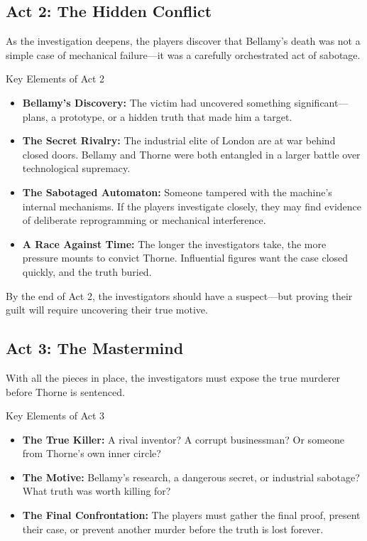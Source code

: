 \subsection{Act 2: The Hidden Conflict}  
As the investigation deepens, the players discover that Bellamy’s death was not a simple case of mechanical failure—it was a carefully orchestrated act of sabotage.

\begin{Example}{Key Elements of Act 2}
    \begin{itemize}
        \item \textbf{Bellamy’s Discovery:} The victim had uncovered something significant—plans, a prototype, or a hidden truth that made him a target.
        \item \textbf{The Secret Rivalry:} The industrial elite of London are at war behind closed doors. Bellamy and Thorne were both entangled in a larger battle over technological supremacy.
        \item \textbf{The Sabotaged Automaton:} Someone tampered with the machine’s internal mechanisms. If the players investigate closely, they may find evidence of deliberate reprogramming or mechanical interference.
        \item \textbf{A Race Against Time:} The longer the investigators take, the more pressure mounts to convict Thorne. Influential figures want the case closed quickly, and the truth buried.
    \end{itemize}
\end{Example}

\noindent
By the end of Act 2, the investigators should have a suspect—but proving their guilt will require uncovering their true motive.

\subsection{Act 3: The Mastermind}

With all the pieces in place, the investigators must expose the true murderer before Thorne is sentenced.

\begin{Example}{Key Elements of Act 3}
    \begin{itemize}\raggedright
        \item \textbf{The True Killer:} A rival inventor? A corrupt businessman? Or someone from Thorne’s own inner circle?
        \item \textbf{The Motive:} Bellamy’s research, a dangerous secret, or industrial sabotage? What truth was worth killing for?
        \item \textbf{The Final Confrontation:} The players must gather the final proof, present their case, or prevent another murder before the truth is lost forever.
    \end{itemize}
\end{Example}

